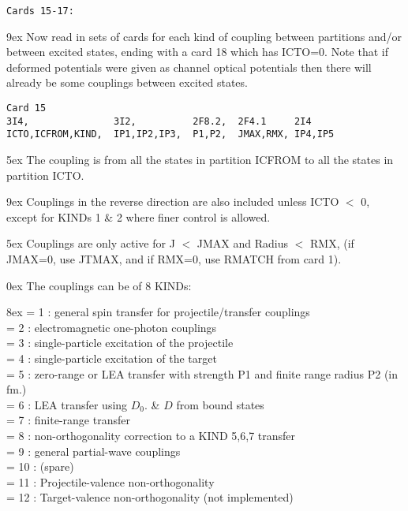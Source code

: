 \documentclass[11pt]{article}
\begin{document}
\begin{verbatim}
Cards 15-17:
\end{verbatim}

\hangindent 9ex
Now read in sets of cards for each kind of coupling between partitions
and/or between excited states, ending with a card 18 which has ICTO=0.
Note that if deformed potentials were given as channel optical
potentials then there will already be some couplings between
excited states.

\begin{verbatim}
Card 15
3I4,               3I2,          2F8.2,  2F4.1     2I4
ICTO,ICFROM,KIND,  IP1,IP2,IP3,  P1,P2,  JMAX,RMX, IP4,IP5
\end{verbatim}

\hangindent 5ex
The coupling is from all the states in partition ICFROM
to all the states in partition ICTO.

\hangindent 9ex
Couplings in the reverse direction are also included unless
ICTO $<$ 0, except for KINDs 1 \& 2 where finer control is allowed.

\hangindent 5ex
Couplings are only active for J $<$ JMAX and Radius $<$ RMX,
(if JMAX=0, use JTMAX, and if RMX=0, use  RMATCH from card 1).

\bigskip

\hangindent 0ex
The couplings can be of 8 KINDs:

\hangindent 8ex
            = 1 : general spin transfer for projectile/transfer couplings\\
            = 2 : electromagnetic one-photon couplings\\
            = 3 : single-particle excitation of the projectile\\
            = 4 : single-particle excitation of the target\\
            = 5 : zero-range or LEA transfer with strength P1 and
finite range radius P2 (in fm.)\\
            = 6 : LEA transfer using $D_0$. \& $D$ from bound states\\
            = 7 : finite-range transfer\\
            = 8 : non-orthogonality correction to a KIND 5,6,7 transfer\\
            = 9 : general partial-wave couplings\\
            = 10 : (spare)\\
            = 11 : Projectile-valence non-orthogonality\\
            = 12 : Target-valence non-orthogonality (not implemented)\\
\end{document}
